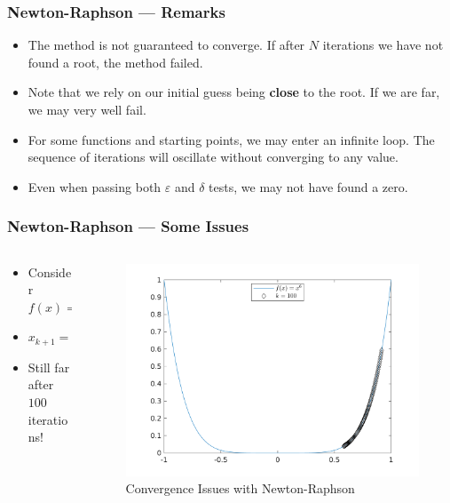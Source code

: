 \documentclass[11pt,xcolor={svgnames},aspectratio=169,usepdftitle=false]{beamer}
\begin{document}
\begin{frame}
  \frametitle{Newton-Raphson --- Remarks}
\begin{itemize}
  \item The method is not guaranteed to converge. If after $N$ iterations we have not found a root, the method failed.
  \item Note that we rely on our initial guess being \alert{\textbf{close}} to the root. If we are far, we may very well fail.
  \item For some functions and starting points, we may enter an infinite loop. The sequence of iterations will oscillate without converging to any value.
  \item Even when passing both $\varepsilon$ and $\delta$ tests, we may not have found a zero.
\end{itemize}
\end{frame}

\begin{frame}[fragile]
  \frametitle{Newton-Raphson --- Some Issues} 
  \begin{columns}
  \begin{column}{0.39\textwidth}
  \begin{itemize}
    \item Consider $f(x) = x^6$
    \item $x_{k+1} = (5/6)x_k$
    \item Still far after $100$ iterations!
  \end{itemize}
  \end{column}
  \begin{column}{0.6\textwidth}
    \begin{figure}
      \centering
      \includegraphics[width = \textwidth]{../figures/newton_convergence_issues.png}
      \caption{Convergence Issues with Newton-Raphson}
      \label{fig:newton_convergence}
    \end{figure}
\end{column}
\end{columns}
\end{frame}
\end{document}
